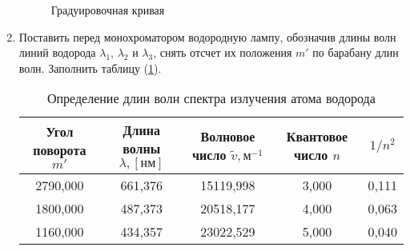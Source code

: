 \documentclass[12pt]{article}
\let\oldref\ref
\renewcommand{\ref}[1]{(\oldref{#1})}
\begin{document}
\begin{enumerate}[wide, labelwidth=!, labelindent=0pt]
\begin{table}[h!]
\begin{tabular}{|c|c|}
            \end{tabular}
        \end{table}
        \begin{figure}[h!]
            \label{graph:1}
            \caption{Градуировочная кривая}
            \centering
        \end{figure}
        \item Поставить  перед  монохроматором  водородную лампу, обозначив длины волн линий водорода $ \lambda_1 $, $ \lambda_2 $ и $ \lambda_3 $, снять отсчет их положения  $ m' $ по барабану длин волн. Заполнить таблицу \ref{tab:2}. 
        \begin{table}[h!]
            \caption{Определение длин волн спектра излучения атома водорода}
            \label{tab:2}
            \centering
            \begin{tabular}{|c|c|c|c|c|}
                \hline
                Угол поворота $ m' $    & Длина волны $\lambda, [нм]$   & Волновое число $ \widetilde{v}, м^{-1} $  & Квантовое число $ n $     & $ 1/n^2 $\\
                \hline
                2790,000 & 661,376 & 15119,998 & 3,000 & 0,111\\ 
 \hline 
1800,000 & 487,373 & 20518,177 & 4,000 & 0,063\\ 
 \hline 
1160,000 & 434,357 & 23022,529 & 5,000 & 0,040\\ 
 \hline 
                

\end{tabular}
\end{table}
\end{enumerate}
\end{document}
